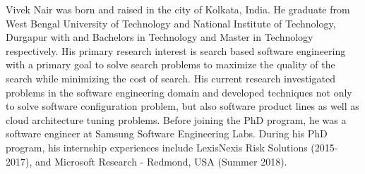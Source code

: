 Vivek Nair was born and raised in the city of Kolkata, India. He graduate from West Bengal University of Technology and National Institute of Technology, Durgapur with and Bachelors in Technology and Master in Technology respectively. 
 His primary research interest is search based software engineering with a primary goal to solve search problems to maximize the quality of the search while minimizing the cost of search.  His current research investigated problems in the software engineering domain and developed techniques not only to solve software configuration problem, but also software product lines as well as cloud architecture tuning problems.  Before joining the PhD program, he
was a software engineer at Samsung Software Engineering Labs. 
During his PhD program, his internship experiences include LexisNexis Risk Solutions (2015-2017), and
Microsoft Research - Redmond, USA (Summer 2018). 


